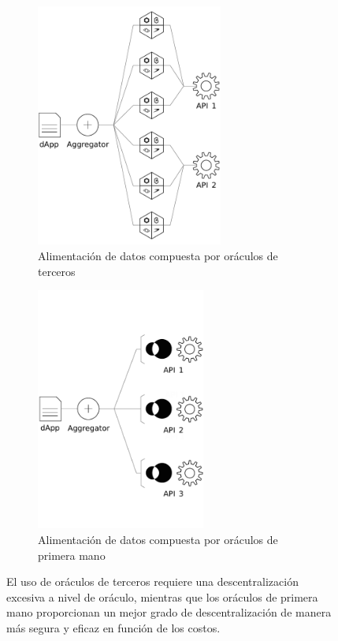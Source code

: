 \documentclass[11pt]{article}
\begin{document}
\begin{figure}
    \centering
    \begin{subfigure}{0.513398876\textwidth}
         \centering
         \includegraphics[height=8cm]{fig/oracle-level-decentralization-a.pdf}
         \caption{Alimentación de datos compuesta por oráculos de terceros }
         \label{fig:oracle-level-decentralization-a}
     \end{subfigure}
     \hfill
     \begin{subfigure}{0.466601124\textwidth}
         \centering
         \includegraphics[height=8cm]{fig/oracle-level-decentralization-b.pdf}
         \caption{Alimentación de datos compuesta por oráculos de primera mano }
         \label{fig:oracle-level-decentralization-b}
     \end{subfigure}
	\caption{El uso de oráculos de terceros requiere una descentralización excesiva a nivel de oráculo, mientras que los oráculos de primera mano proporcionan un mejor grado de descentralización de manera más segura y eficaz en función de los costos.}
	\label{fig:oracle-level-decentralization}
\end{figure}
\end{document}
